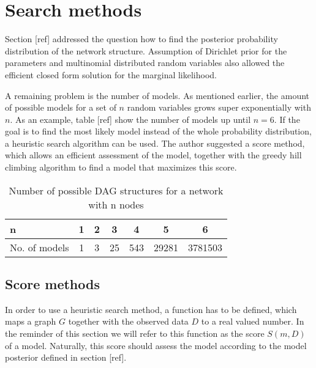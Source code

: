 \documentclass{article}
\begin{document}
\section{Search methods}
	Section [ref] addressed the question how to find the posterior probability distribution of the
	network structure. Assumption of Dirichlet prior for the parameters and multinomial distributed
	random variables also allowed the efficient closed form solution for the marginal likelihood.
	
	A remaining problem is the number of models. As mentioned earlier, the amount of possible
	models for a set of $n$ random	variables grows super exponentially with $n$. As an example,
	table [ref] show the number of models up until $n=6$. If the goal is to find the
	most likely model instead of the whole probability distribution, a heuristic search algorithm
	can be used. The author suggested a score method, which allows an efficient assessment of the
	model, together with the greedy hill climbing algorithm to find a model that
	maximizes this score.
	
	\begin{table}[t]
	\caption{Number of possible DAG structures for a network with n nodes}
	\begin{center}
		\begin{small}
			\begin{sc}
				\begin{tabular}{l|c|c|c|c|c|c}
					\hline
					\abovespace
					\belowspace
					n & 1 & 2 & 3 & 4 & 5 & 6\\
					\hline
					\abovespace
					\belowspace
					No. of models & 1 & 3 & 25 & 543 & 29281 & 3781503\\
					\hline
				\end{tabular}
			\end{sc}
		\end{small}
	\end{center}
	\vskip -0.1in
	\end{table}
	
	\subsection{Score methods}
	In order to use a heuristic search method, a function has to be defined,
	which maps a graph $G$	together with the observed data $D$ to a real valued number. 
	In the reminder of this section we will refer to this function as the score $S(m,D)$
	of a model. Naturally, this score should assess the model according to the model posterior defined
	in section [ref]. 
	
\end{document}
